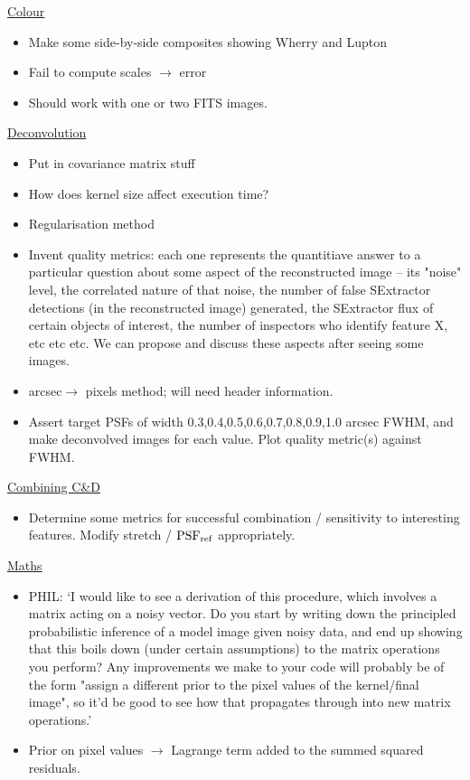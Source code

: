 \documentclass[letterpaper, 11pt]{article}
\def\psfref{\ensuremath{{\rm PSF_{ref}}}\xspace}
\def\ra{\ensuremath{\rightarrow}\xspace}
\begin{document}
\underline{Colour}
\begin{itemize}
	\item Make some side-by-side composites showing Wherry and Lupton
	\item Fail to compute scales $\rightarrow$ error
	\item Should work with one or two FITS images.
\end{itemize}

\underline{Deconvolution}
\begin{itemize}
	\item Put in covariance matrix stuff
	\item How does kernel size affect execution time?
	\item Regularisation method
	\item Invent quality metrics: each one represents the quantitiave answer to a particular question about some aspect of the reconstructed image -- its "noise" level, the correlated nature of that noise, the number of false SExtractor detections (in the reconstructed image) generated, the SExtractor flux of certain
objects of interest, the number of inspectors who identify feature X, etc etc etc. We can propose and discuss these aspects after seeing some images.
	\item arcsec\ra pixels method; will need header information.
	\item Assert target PSFs of width 0.3,0.4,0.5,0.6,0.7,0.8,0.9,1.0 arcsec FWHM, and make deconvolved images for each value. Plot quality metric(s) against FWHM.
\end{itemize}

\underline{Combining C\&D}
\begin{itemize}
	\item Determine some metrics for successful combination / sensitivity to interesting features. Modify stretch / \psfref appropriately.
\end{itemize}

\underline{Maths}
\begin{itemize}
	\item PHIL: `I would like to see a derivation of this procedure, which involves a matrix acting on a noisy vector. Do you start by writing down the principled probabilistic inference of a model image given noisy data, and end up showing that this boils down (under certain assumptions) to the matrix operations you perform? Any improvements we make to your code will probably be of the form "assign a different prior to the pixel values of the kernel/final image", so it'd be good to see how that propagates through into new matrix operations.'

	\item Prior on pixel values \ra Lagrange term added to the summed squared residuals.
\end{itemize}
\end{document}
